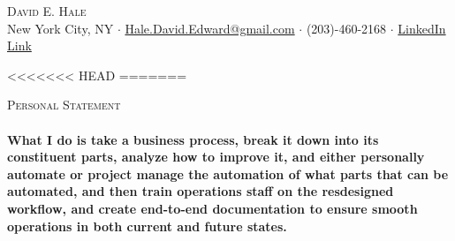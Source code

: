 \documentclass[a4paper]{article}
\newcommand{\lineunder} {
    \vspace*{-8pt} \\
    \hspace*{-18pt} \hrulefill \\
}
\newcommand{\header} [1] {
    {\hspace*{-18pt}\vspace*{6pt} \textsc{#1}}
    \vspace*{-6pt} \lineunder
}
\begin{document}
\vspace*{-40pt}

    

\vspace*{-9pt}
\begin{center}
	{\Large \scshape {David E. Hale}}\\
	New York City, NY $\cdot$ \href{mailto:Hale.David.Edward@gmail.com}{Hale.David.Edward@gmail.com} $\cdot$ (203)-460-2168 $\cdot$ \href{http://linkedin.com/in/david-hale-2598a791/}{LinkedIn Link}\\
\end{center}

<<<<<<< HEAD
=======
\header{Personal Statement}
\vspace{1mm}
\textbf{What I do is take a business process, break it down into its constituent parts, analyze how to improve it, and either personally automate  or project manage the automation 
        of what parts that can be automated, and then train operations staff on the resdesigned workflow, and create
        end-to-end documentation to ensure smooth operations in both current and future states.
}
\end{document}
